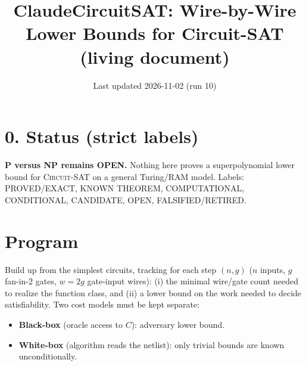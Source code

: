 \documentclass[11pt]{article}
\newcommand{\SAT}{\textsc{Circuit-SAT}}
\begin{document}
\title{ClaudeCircuitSAT: Wire-by-Wire Lower Bounds for Circuit-SAT\\(living document)}
\date{Last updated 2026-11-02 (run 10)}
\maketitle

\section*{0. Status (strict labels)}
\textbf{P versus NP remains OPEN.} Nothing here proves a superpolynomial lower bound
for \SAT{} on a general Turing/RAM model. Labels: PROVED/EXACT, KNOWN THEOREM,
COMPUTATIONAL, CONDITIONAL, CANDIDATE, OPEN, FALSIFIED/RETIRED.

\section{Program}
Build up from the simplest circuits, tracking for each step $(n,g)$ ($n$ inputs, $g$ fan-in-2
gates, $w=2g$ gate-input wires): (i) the minimal wire/gate count needed to realize the
function class, and (ii) a lower bound on the work needed to decide satisfiability.
Two cost models must be kept separate:
\begin{itemize}
\item \textbf{Black-box} (oracle access to $C$): adversary lower bound.
\item \textbf{White-box} (algorithm reads the netlist): only trivial bounds are known unconditionally.
\end{itemize}
\end{document}
